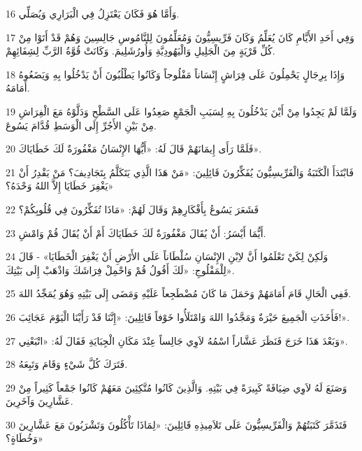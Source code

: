 \par 16 وَأَمَّا هُوَ فَكَانَ يَعْتَزِلُ فِي الْبَرَارِي وَيُصَلِّي.
\par 17 وَفِي أَحَدِ الأَيَّامِ كَانَ يُعَلِّمُ وَكَانَ فَرِّيسِيُّونَ وَمُعَلِّمُونَ لِلنَّامُوسِ جَالِسِينَ وَهُمْ قَدْ أَتَوْا مِنْ كُلِّ قَرْيَةٍ مِنَ الْجَلِيلِ وَالْيَهُودِيَّةِ وَأُورُشَلِيمَ. وَكَانَتْ قُوَّةُ الرَّبِّ لِشِفَائِهِمْ.
\par 18 وَإِذَا بِرِجَالٍ يَحْمِلُونَ عَلَى فِرَاشٍ إِنْسَاناً مَفْلُوجاً وَكَانُوا يَطْلُبُونَ أَنْ يَدْخُلُوا بِهِ وَيَضَعُوهُ أَمَامَهُ.
\par 19 وَلَمَّا لَمْ يَجِدُوا مِنْ أَيْنَ يَدْخُلُونَ بِهِ لِسَبَبِ الْجَمْعِ صَعِدُوا عَلَى السَّطْحِ وَدَلَّوْهُ مَعَ الْفِرَاشِ مِنْ بَيْنِ الأَجُرِّ إِلَى الْوَسَطِ قُدَّامَ يَسُوعَ.
\par 20 فَلَمَّا رَأَى إِيمَانَهُمْ قَالَ لَهُ: «أَيُّهَا الإِنْسَانُ مَغْفُورَةٌ لَكَ خَطَايَاكَ».
\par 21 فَابْتَدَأَ الْكَتَبَةُ وَالْفَرِّيسِيُّونَ يُفَكِّرُونَ قَائِلِينَ: «مَنْ هَذَا الَّذِي يَتَكَلَّمُ بِتَجَادِيفَ؟ مَنْ يَقْدِرُ أَنْ يَغْفِرَ خَطَايَا إِلاَّ اللهُ وَحْدَهُ؟»
\par 22 فَشَعَرَ يَسُوعُ بِأَفْكَارِهِمْ وَقَالَ لَهُمْ: «مَاذَا تُفَكِّرُونَ فِي قُلُوبِكُمْ؟
\par 23 أَيُّمَا أَيْسَرُ: أَنْ يُقَالَ مَغْفُورَةٌ لَكَ خَطَايَاكَ أَمْ أَنْ يُقَالَ قُمْ وَامْشِ.
\par 24 وَلَكِنْ لِكَيْ تَعْلَمُوا أَنَّ لاِبْنِ الإِنْسَانِ سُلْطَاناً عَلَى الأَرْضِ أَنْ يَغْفِرَ الْخَطَايَا» - قَالَ لِلْمَفْلُوجِ: «لَكَ أَقُولُ قُمْ وَاحْمِلْ فِرَاشَكَ وَاذْهَبْ إِلَى بَيْتِكَ».
\par 25 فَفِي الْحَالِ قَامَ أَمَامَهُمْ وَحَمَلَ مَا كَانَ مُضْطَجِعاً عَلَيْهِ وَمَضَى إِلَى بَيْتِهِ وَهُوَ يُمَجِّدُ اللهَ.
\par 26 فَأَخَذَتِ الْجَمِيعَ حَيْرَةٌ وَمَجَّدُوا اللهَ وَامْتَلَأُوا خَوْفاً قَائِلِينَ: «إِنَّنَا قَدْ رَأَيْنَا الْيَوْمَ عَجَائِبَ!».
\par 27 وَبَعْدَ هَذَا خَرَجَ فَنَظَرَ عَشَّاراً اسْمُهُ لاَوِي جَالِساً عِنْدَ مَكَانِ الْجِبَايَةِ فَقَالَ لَهُ: «اتْبَعْنِي».
\par 28 فَتَرَكَ كُلَّ شَيْءٍ وَقَامَ وَتَبِعَهُ.
\par 29 وَصَنَعَ لَهُ لاَوِي ضِيَافَةً كَبِيرَةً فِي بَيْتِهِ. وَالَّذِينَ كَانُوا مُتَّكِئِينَ مَعَهُمْ كَانُوا جَمْعاً كَثِيراً مِنْ عَشَّارِينَ وَآخَرِينَ.
\par 30 فَتَذَمَّرَ كَتَبَتُهُمْ وَالْفَرِّيسِيُّونَ عَلَى تَلاَمِيذِهِ قَائِلِينَ: «لِمَاذَا تَأْكُلُونَ وَتَشْرَبُونَ مَعَ عَشَّارِينَ وَخُطَاةٍ؟»
